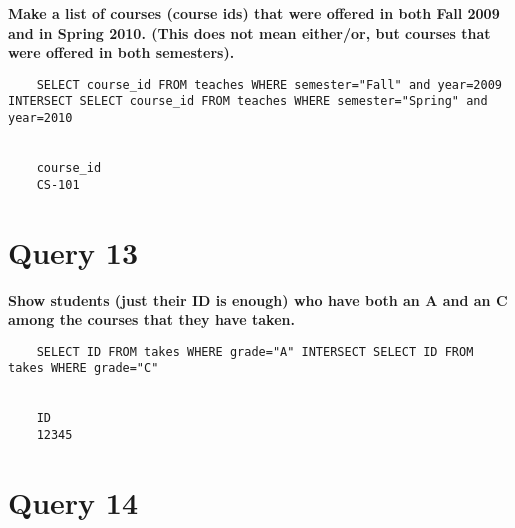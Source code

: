\documentclass[letterpaper]{article}
\begin{document}
    \textbf{Make a list of courses (course ids) that were offered in both Fall 2009 and in Spring 2010.   (This does not mean either/or, but courses that were offered in both semesters).}
    \begin{lstlisting}
    SELECT course_id FROM teaches WHERE semester="Fall" and year=2009 INTERSECT SELECT course_id FROM teaches WHERE semester="Spring" and year=2010
       
       
    course_id
    CS-101
    \end{lstlisting}
        
\section{Query 13}

    \textbf{Show students (just their ID is enough) who have both an A and an C among the courses that they have taken.}
    \begin{lstlisting}
    SELECT ID FROM takes WHERE grade="A" INTERSECT SELECT ID FROM takes WHERE grade="C"


    ID
    12345
    \end{lstlisting}
        
\section{Query 14}
\end{document}
